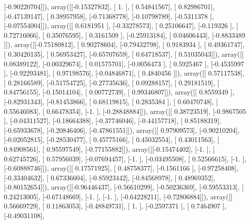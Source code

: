 \documentclass{article}
\begin{document}
       [-0.90220704]]), array([[-0.15327832],
       [ 1.        ],
       [ 0.54841567],
       [ 0.82986701],
       [-0.47139147],
       [ 0.38957958],
       [-0.71368778],
       [-0.10798789],
       [-0.5311378 ],
       [-0.07554004]]), array([[ 0.6181951 ],
       [-0.33278573],
       [ 0.25106647],
       [-0.119326  ],
       [ 0.72716066],
       [ 0.35076595],
       [ 0.3161509 ],
       [-0.25913184],
       [ 0.04606443],
       [-0.8833489 ]]), array([[-0.75180812],
       [ 0.90278604],
       [-0.79432798],
       [ 0.9183934 ],
       [ 0.49361747],
       [ 0.30420135],
       [ 0.56953427],
       [-0.65707659],
       [ 0.64718537],
       [ 0.51035043]]), array([[ 0.08389122],
       [-0.00329674],
       [ 0.01575701],
       [-0.0056473 ],
       [ 0.5925467 ],
       [-0.4535997 ],
       [-0.92293481],
       [ 0.97198576],
       [-0.04846871],
       [ 0.4840456 ]]), array([[ 0.57117538],
       [ 0.28166589],
       [-0.51754725],
       [-0.27735636],
       [ 0.09288157],
       [ 0.29181519],
       [ 0.84756155],
       [-0.15014104],
       [ 0.00772739],
       [ 0.99346807]]), array([[ 0.8559349 ],
       [-0.82931343],
       [-0.81453866],
       [ 0.68119815],
       [ 0.2835384 ],
       [ 0.60470748],
       [ 0.55646083],
       [ 0.66478354],
       [-1.        ],
       [-0.28848884]]), array([[ 0.38723519],
       [-0.9867505 ],
       [-0.04311527],
       [-0.18664388],
       [-0.37746046],
       [-0.44157718],
       [ 0.85188319],
       [-0.65933678],
       [-0.20846406],
       [-0.47861551]]), array([[ 0.97909573],
       [-0.90210204],
       [-0.02052815],
       [-0.28530477],
       [ 0.45775166],
       [ 0.45032554],
       [ 0.43011563],
       [ 0.84908561],
       [ 0.95597549],
       [-0.77155882]]), array([[-0.15474402],
       [-1.        ],
       [ 0.62745726],
       [ 0.57956039],
       [-0.07694457],
       [-1.        ],
       [-0.03495508],
       [ 0.52566615],
       [-1.        ],
       [-0.60888746]]), array([[ 0.17571925],
       [ 0.48758377],
       [-0.1561166 ],
       [-0.97258408],
       [-0.33404632],
       [ 0.67336604],
       [-0.85923442],
       [-0.84568978],
       [ 0.48969352],
       [-0.80152654]]), array([[-0.96446437],
       [-0.56610299],
       [-0.50236369],
       [-0.59553313],
       [ 0.24213005],
       [-0.67148669],
       [-1.        ],
       [-1.        ],
       [-0.64228211],
       [-0.72806884]]), array([[ 0.56669729],
       [ 0.11863053],
       [-0.48849731],
       [ 1.        ],
       [-0.2597371 ],
       [ 0.7464907 ],
       [-0.49031108],
\end{document}
